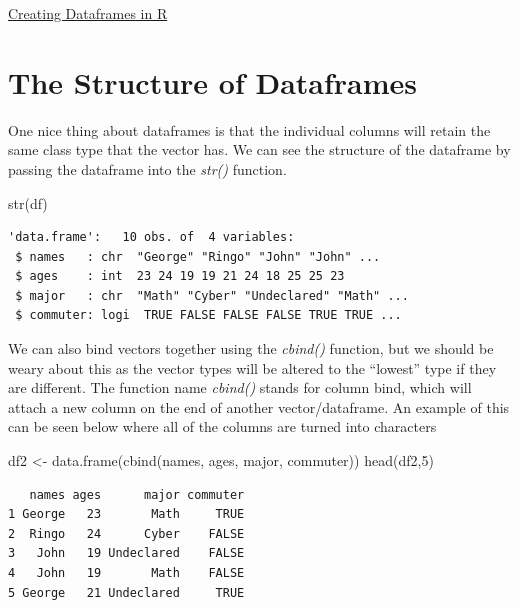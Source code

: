 \documentclass[
  letterpaper,
  DIV=11,
  numbers=noendperiod]{scrreprt}
\newenvironment{Shaded}{\begin{snugshade}}{\end{snugshade}}
\newcommand{\DecValTok}[1]{\textcolor[rgb]{0.68,0.00,0.00}{#1}}
\newcommand{\FunctionTok}[1]{\textcolor[rgb]{0.28,0.35,0.67}{#1}}
\newcommand{\NormalTok}[1]{\textcolor[rgb]{0.00,0.23,0.31}{#1}}
\newcommand{\OtherTok}[1]{\textcolor[rgb]{0.00,0.23,0.31}{#1}}
\begin{document}
\begin{watch}{}{}
    \href{https://youtu.be/KjMZt7-YDVQ}{Creating Dataframes in R}
\end{watch}

\section{The Structure of Dataframes}\label{the-structure-of-dataframes}

One nice thing about dataframes is that the individual columns will
retain the same class type that the vector has. We can see the structure
of the dataframe by passing the dataframe into the \emph{str()}
function.

\begin{Shaded}
\begin{Highlighting}[]
\FunctionTok{str}\NormalTok{(df)}
\end{Highlighting}
\end{Shaded}

\begin{verbatim}
'data.frame':   10 obs. of  4 variables:
 $ names   : chr  "George" "Ringo" "John" "John" ...
 $ ages    : int  23 24 19 19 21 24 18 25 25 23
 $ major   : chr  "Math" "Cyber" "Undeclared" "Math" ...
 $ commuter: logi  TRUE FALSE FALSE FALSE TRUE TRUE ...
\end{verbatim}

We can also bind vectors together using the \emph{cbind()} function, but
we should be weary about this as the vector types will be altered to the
``lowest'' type if they are different. The function name \emph{cbind()}
stands for column bind, which will attach a new column on the end of
another vector/dataframe. An example of this can be seen below where all
of the columns are turned into characters

\begin{Shaded}
\begin{Highlighting}[]
\NormalTok{df2 }\OtherTok{\textless{}{-}} \FunctionTok{data.frame}\NormalTok{(}\FunctionTok{cbind}\NormalTok{(names, ages, major, commuter))}
\FunctionTok{head}\NormalTok{(df2,}\DecValTok{5}\NormalTok{)}
\end{Highlighting}
\end{Shaded}

\begin{verbatim}
   names ages      major commuter
1 George   23       Math     TRUE
2  Ringo   24      Cyber    FALSE
3   John   19 Undeclared    FALSE
4   John   19       Math    FALSE
5 George   21 Undeclared     TRUE
\end{verbatim}
\end{document}
